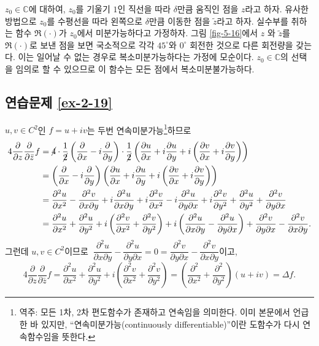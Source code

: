 $z_0 \in \mathbb C$에 대하여,
$z_0$를 기울기 $1$인 직선을 따라 $\delta$만큼 움직인 점을 $z$라고 하자.
유사한 방법으로 $z_0$를 수평선을 따라 왼쪽으로 $\delta$만큼 이동한 점을 $\tilde z$라고 하자.
실수부를 취하는 함수 $\Re(\cdot)$가 $z_0$에서 미분가능하다고 가정하자.
그림 \ref{fig-5-16}에서 $z$ 와 $\tilde z$를 $\Re(\cdot)$로 보낸 점을 보면 
국소적으로 각각 $45^\circ$와 $0^\circ$ 회전한 것으로 다른 회전량을 갖는다.
이는 일어날 수 없는 경우로 복소미분가능하다는 가정에 모순이다.
$z_0\in \mathbb C$의 선택을 임의로  할 수 있으므로
이 함수는 모든 점에서 복소미분불가능하다.




\subsection*{연습문제 \ref{ex-2-19}}

$u,v\in C^2$인 $f=u+iv$는 두번 연속미분가능\footnote{
역주: 모든 1차, 2차 편도함수가 존재하고 연속임을 의미한다.
이미 본문에서 언급한 바 있지만,
``연속미분가능(continuously differentiable)''이란 도함수가 다시 연속함수임을 뜻한다.
}하므로
\begin{align*}
4\dfrac\partial{\partial z}\dfrac\partial{\partial \bar z}f
&= \cancel{4}\cdot \dfrac1{\cancel{2}} \left(\dfrac\partial{\partial x} - i \dfrac\partial{\partial y} \right)
\cdot\dfrac1{\cancel{2}} \left( \dfrac{\partial u}{\partial x} + i \dfrac{\partial u}{\partial y}
+ i \left( \dfrac{\partial v}{\partial x} + i \dfrac{\partial v}{\partial y} \right) \right) \\
&=\left(\dfrac\partial{\partial x} - i \dfrac\partial{\partial y} \right)
\left( \dfrac{\partial u}{\partial x} + i \dfrac{\partial u}{\partial y}
+ i \left( \dfrac{\partial v}{\partial x} + i \dfrac{\partial v}{\partial y} \right) \right) \\
&= \dfrac{\partial^2 u}{\partial x^2} - \dfrac{\partial^2 v}{\partial x \partial y}
+ i \dfrac{\partial^2 u}{\partial x \partial y} + i\dfrac{\partial^2 v}{\partial x^2}
- i \dfrac{\partial^2 u}{\partial y \partial x} + i \dfrac{\partial^2 v}{\partial y^2}
+ \dfrac{\partial^2 u}{\partial y^2}  + \dfrac{\partial^2 v}{\partial y\partial x}  \\
&= \dfrac{\partial^2 u}{\partial x^2} + \dfrac{\partial^2 u}{\partial y^2} 
+ i\left( \dfrac{\partial^2 v}{\partial x^2} + \dfrac{\partial^2 v}{\partial y^2} \right)
+ i\left( \dfrac{\partial^2 u}{\partial x\partial y} - \dfrac{\partial^2 u}{\partial y\partial x} \right)
+ \dfrac{\partial^2 v}{\partial y\partial x}  - \dfrac{\partial^2 v}{\partial x\partial y} .
\end{align*}
그런데 $u,v\in C^2$이므로
$\ \dfrac{\partial^2 u}{\partial x\partial y} - \dfrac{\partial^2 u}{\partial y\partial x} = 0
= \dfrac{\partial^2 v}{\partial y\partial x} - \dfrac{\partial^2 v}{\partial x\partial y}$이고,
\[
4\dfrac\partial{\partial z}\dfrac\partial{\partial \bar z}f
= \dfrac{\partial^2 u}{\partial x^2} + \dfrac{\partial^2 u}{\partial y^2} 
+ i \left( \dfrac{\partial^2 v}{\partial x^2} + \dfrac{\partial^2 v}{\partial y^2} \right)
= \left( \dfrac{\partial^2}{\partial x^2} + \dfrac{\partial^2}{\partial y^2} \right)(u+iv)
= \Delta f.
\]




%


